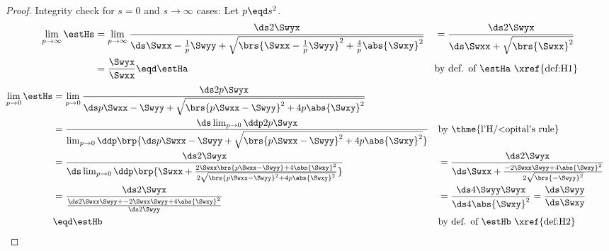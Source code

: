 \begin{proof}
Integrity check for $s=0$ and $s\to\infty$ cases:
Let $p\eqd s^2$.
\begin{align*}
  \lim_{p\to\infty}\estHs 
    &=    \lim_{p\to\infty} 
          \frac{\ds 2\Swyx }
                {\ds  \Swxx -\frac{1}{p}\Swyy  +
                 \sqrt{\brs{\Swxx -\frac{1}{p}\Swyy }^2 + \frac{4}{p}\abs{\Swxy }^2}
                }
   &&=    \frac{\ds 2\Swyx }
               {\ds  \Swxx  +
                 \sqrt{\brs{\Swxx }^2 }
               }
  \\&=    \frac{\Swyx }
               {\Swxx }
     \eqd \estHa 
    && \text{by def. of $\estHa$ 
             \xref{def:H1}}
\end{align*}
\begin{align*}
  \lim_{p\to0}\estHs
    &=    \lim_{p\to0} 
          \frac{\ds 2p\Swyx }
                {\ds  p\Swxx -\Swyy  +
                 \sqrt{\brs{p\Swxx -\Swyy }^2 + 4p\abs{\Swxy }^2}
                }
  \\&=    \frac{\ds \lim_{p\to0} \ddp 2p\Swyx }
                {\lim_{p\to0} \ddp\brp{\ds  p\Swxx -\Swyy  +
                 \sqrt{\brs{p\Swxx -\Swyy }^2 + 4p\abs{\Swxy }^2}
                }}
    &&    \text{by \thme{l'H{/<o}pital's rule}}
  \\&=    \frac{\ds 2\Swyx }
                {\ds \lim_{p\to0} \ddp\brp{ \Swxx  +
                 \frac{2\Swxx\brs{p\Swxx -\Swyy } + 4\abs{\Swxy }^2}
                      {2\sqrt{\brs{p\Swxx -\Swyy }^2 + 4p\abs{\Swxy }^2}}
                }}
   &&=    \frac{\ds 2\Swyx }
                {\ds  \Swxx  +
                 \frac{-2\Swxx\Swyy  + 4\abs{\Swxy }^2}
                      {2\sqrt{\brs{-\Swyy }^2}}
                }
  \\&=    \frac{\ds 2\Swyx }{
               \frac{\ds2\Swxx \Swyy  + -2\Swxx\Swyy  + 4\abs{\Swxy }^2}
                    {\ds2\Swyy }
               }
   &&=    \frac{\ds 4\Swyy \Swyx }
               {\ds 4\abs{\Swxy }^2}
     =    \frac{\ds \Swyy }
               {\ds \Swxy }
  \\&\eqd \estHb 
    && \text{by def. of $\estHb$ 
             \xref{def:H2}}
\end{align*}
\end{proof}

